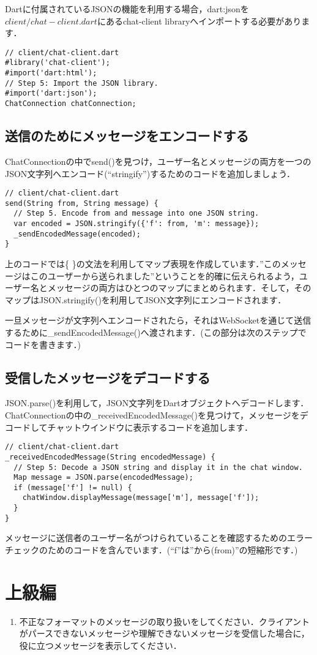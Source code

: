 Dartに付属されているJSONの機能を利用する場合，dart:jsonを$ client/chat-client.dart $にあるchat-client libraryへインポートする必要があります．

\begin{verbatim}
// client/chat-client.dart
#library('chat-client');
#import('dart:html');
// Step 5: Import the JSON library.
#import('dart:json');
ChatConnection chatConnection;
\end{verbatim}

\subsection{送信のためにメッセージをエンコードする}

ChatConnectionの中でsend()を見つけ，ユーザー名とメッセージの両方を一つのJSON文字列へエンコード(``stringify'')するためのコードを追加しましょう．

\begin{verbatim}
// client/chat-client.dart
send(String from, String message) {
  // Step 5. Encode from and message into one JSON string.
  var encoded = JSON.stringify({'f': from, 'm': message});
  _sendEncodedMessage(encoded);
}
\end{verbatim}

上のコードでは\{ \}の文法を利用してマップ表現を作成しています．''このメッセージはこのユーザーから送られました''ということを的確に伝えられるよう，ユーザー名とメッセージの両方はひとつのマップにまとめられます．そして，そのマップはJSON.stringify()を利用してJSON文字列にエンコードされます．

一旦メッセージが文字列へエンコードされたら，それはWebSocketを通じて送信するために\_sendEncodedMessage()へ渡されます．(この部分は次のステップでコードを書きます．)

\subsection{受信したメッセージをデコードする}

JSON.parse()を利用して，JSON文字列をDartオブジェクトへデコードします．ChatConnectionの中の\_receivedEncodedMessage()を見つけて，メッセージをデコードしてチャットウインドウに表示するコードを追加します．

\begin{verbatim}
// client/chat-client.dart
_receivedEncodedMessage(String encodedMessage) {
  // Step 5: Decode a JSON string and display it in the chat window.
  Map message = JSON.parse(encodedMessage);
  if (message['f'] != null) {
    chatWindow.displayMessage(message['m'], message['f']);
  }
}
\end{verbatim}

メッセージに送信者のユーザー名がつけられていることを確認するためのエラーチェックのためのコードを含んでいます．(``f''は''から(from)''の短縮形です．)

\section{上級編}

\begin{enumerate}
\item 不正なフォーマットのメッセージの取り扱いをしてください．クライアントがパースできないメッセージや理解できないメッセージを受信した場合に，役に立つメッセージを表示してください．
\end{enumerate}
